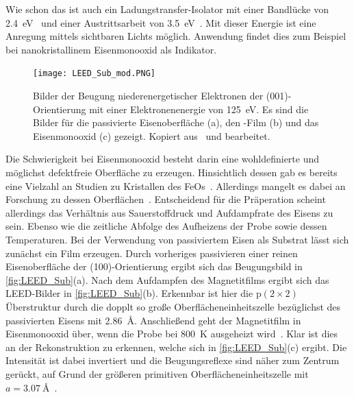             Wie schon das  ist auch  ein Ladungstransfer-Isolator mit einer Bandlücke von \SI{2.4}{\electronvolt}~\cite{FeO_21} und einer Austrittsarbeit von \SI{3.5}{\electronvolt}~\cite{FeO_28}.
            Mit dieser Energie ist eine Anregung mittels sichtbaren Lichts möglich.
            Anwendung findet dies zum Beispiel bei nanokristallinem Eisenmonooxid als Indikator.
            \begin{figure}
                \centering
                \texttt{[image: LEED\_Sub\_mod.PNG]}
                \caption{Bilder der Beugung niederenergetischer Elektronen der (001)-Orientierung mit einer Elektronenenergie von \SI{125}{\electronvolt}.
                Es sind die Bilder für die passivierte Eisenoberfläche (a), den -Film (b) und das Eisenmonooxid (c) gezeigt. Kopiert aus~\cite{FeO_1} und bearbeitet.}
                \label{fig:LEED_Sub}
            \end{figure}
            Die Schwierigkeit bei Eisenmonooxid besteht darin eine wohldefinierte und möglichst defektfreie Oberfläche zu erzeugen.
            Hinsichtlich dessen gab es bereits eine Vielzahl an Studien zu Kristallen des FeOs~\cite{FeO_7, FeO_19, FeO_26, FeO_23, FeO_27}.
            Allerdings mangelt es dabei an Forschung zu dessen Oberflächen~\cite{FeO_1, FeO_4, FeO_29}.
            Entscheidend für die Präperation scheint allerdings das Verhältnis aus Sauerstoffdruck und Aufdampfrate des Eisens zu sein.
            Ebenso wie die zeitliche Abfolge des Aufheizens der Probe sowie dessen Temperaturen.
            Bei der Verwendung von passiviertem Eisen als Substrat lässt sich zunächst ein  Film erzeugen.
            Durch vorheriges passivieren einer reinen Eisenoberfläche der (100)-Orientierung ergibt sich das Beugungsbild in \autoref{fig:LEED_Sub}(a).
            Nach dem Aufdampfen des Magnetitfilms ergibt sich das LEED-Bilder in \autoref{fig:LEED_Sub}(b).
            Erkennbar ist hier die $\text{p}(2\times 2)$ Überstruktur durch die dopplt so große Oberflächeneinheitszelle bezüglichst des passivierten Eisens mit \SI{2.86}{\angstrom}.
            Anschließend geht der Magnetitfilm in Eisenmonooxid über, wenn die Probe bei \SI{800}{\kelvin} ausgeheizt wird~\cite{FeO_1}.
            Klar ist dies an der Rekonstruktion zu erkennen, welche sich in \autoref{fig:LEED_Sub}(c) ergibt.
            Die Intensität ist dabei invertiert und die Beugungsreflexe sind näher zum Zentrum gerückt, auf Grund der größeren primitiven Oberflächeneinheitszelle mit $a = \SI{3.07}{\angstrom}$~\cite{FeO_1}.

